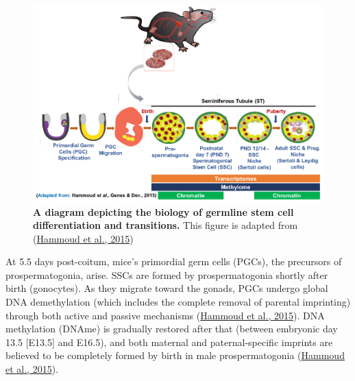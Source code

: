\documentclass[12pt,twoside]{reedthesis}
\begin{document}
\begin{figure}[htbp]

{\centering \includegraphics{thesis_files/figure-latex/if2-1} 

}

\caption[A diagram depicting the biology of germline stem celldifferentiation and transitions]{\textbf{A diagram depicting the biology of germline stem cell differentiation and transitions.}
This figure is adapted from (\protect\hyperlink{ref-hammoud2015}{Hammoud et al., 2015})}\label{fig:if2}
\end{figure}
At 5.5 days post-coitum, mice's primordial germ cells (PGCs), the
precursors of prospermatogonia, arise. SSCs are formed by
prospermatogonia shortly after birth (gonocytes). As they migrate toward
the gonads, PGCs undergo global DNA demethylation (which includes the
complete removal of parental imprinting) through both active and passive
mechanisms (\protect\hyperlink{ref-hammoud2015}{Hammoud et al., 2015}). DNA methylation (DNAme) is gradually restored
after that (between embryonic day 13.5 {[}E13.5{]} and E16.5), and both
maternal and paternal-specific imprints are believed to be completely
formed by birth in male prospermatogonia (\protect\hyperlink{ref-hammoud2015}{Hammoud et al., 2015}).
\end{document}
